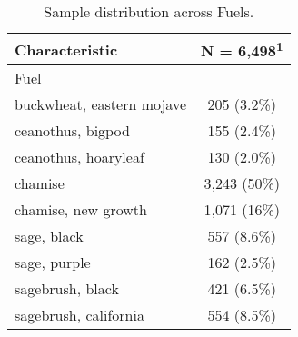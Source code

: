 \captionsetup[table]{labelformat=empty,skip=1pt}
\begin{table}{}
\begin{tabular}{l c}
\toprule
\textbf{Characteristic} & \textbf{N = 6,498}\textsuperscript{1} \\ 
\midrule
Fuel &  \\ 
buckwheat, eastern mojave & 205 (3.2\%) \\ 
ceanothus, bigpod & 155 (2.4\%) \\ 
ceanothus, hoaryleaf & 130 (2.0\%) \\ 
chamise & 3,243 (50\%) \\ 
chamise, new growth & 1,071 (16\%) \\ 
sage, black & 557 (8.6\%) \\ 
sage, purple & 162 (2.5\%) \\ 
sagebrush, black & 421 (6.5\%) \\ 
sagebrush, california & 554 (8.5\%) \\ 
 \bottomrule
\end{tabular}
    \caption{Sample distribution across Fuels.}
\end{table}
